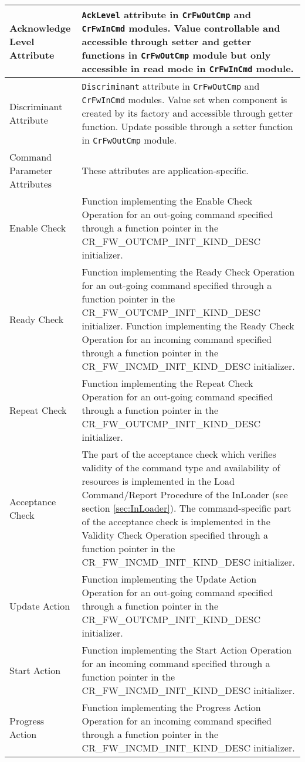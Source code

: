 \documentclass{pnp_article}
\begin{document}
\begin{longtable}{|>{\raggedright}p{2.0cm}|p{11.3cm}|}
\hline
Acknowledge Level Attribute & \texttt{AckLevel} attribute in \texttt{CrFwOutCmp} and \texttt{CrFwInCmd} modules. Value controllable and accessible through setter and getter functions in \texttt{CrFwOutCmp} module but only accessible in read mode in \texttt{CrFwInCmd} module. \\
\hline
Discriminant Attribute & \texttt{Discriminant} attribute in \texttt{CrFwOutCmp} and \texttt{CrFwInCmd} modules. Value set when component is created by its factory and accessible through getter function. Update possible through a setter function in \texttt{CrFwOutCmp} module.  \\
\hline
Command Parameter Attributes & These attributes are application-specific.  \\
\hline
Enable Check & Function implementing the Enable Check Operation for an out-going command specified through a function pointer in the CR\_FW\_OUTCMP\_INIT\_KIND\_DESC initializer.  \\
\hline
Ready Check & Function implementing the Ready Check Operation for an out-going command specified through a function pointer in the CR\_FW\_OUTCMP\_INIT\_KIND\_DESC initializer. Function implementing the Ready Check Operation for an incoming command specified through a function pointer in the CR\_FW\_INCMD\_INIT\_KIND\_DESC initializer. \\
\hline
Repeat Check & Function implementing the Repeat Check Operation for an out-going command specified through a function pointer in the CR\_FW\_OUTCMP\_INIT\_KIND\_DESC initializer.  \\
\hline
Acceptance Check & The part of the acceptance check which verifies validity of the command type and availability of resources is implemented in the Load Command/Report Procedure of the InLoader (see section \ref{sec:InLoader}). The command-specific part of the acceptance check is implemented in the Validity Check Operation specified through a function pointer in the CR\_FW\_INCMD\_INIT\_KIND\_DESC initializer.  \\
\hline
Update Action & Function implementing the Update Action Operation for an out-going command specified through a function pointer in the CR\_FW\_OUTCMP\_INIT\_KIND\_DESC initializer.  \\
\hline
Start Action & Function implementing the Start Action Operation for an incoming command specified through a function pointer in the CR\_FW\_INCMD\_INIT\_KIND\_DESC initializer. \\
\hline
Progress Action & Function implementing the Progress Action Operation for an incoming command specified through a function pointer in the CR\_FW\_INCMD\_INIT\_KIND\_DESC initializer. \\

\end{longtable}
\end{document}
